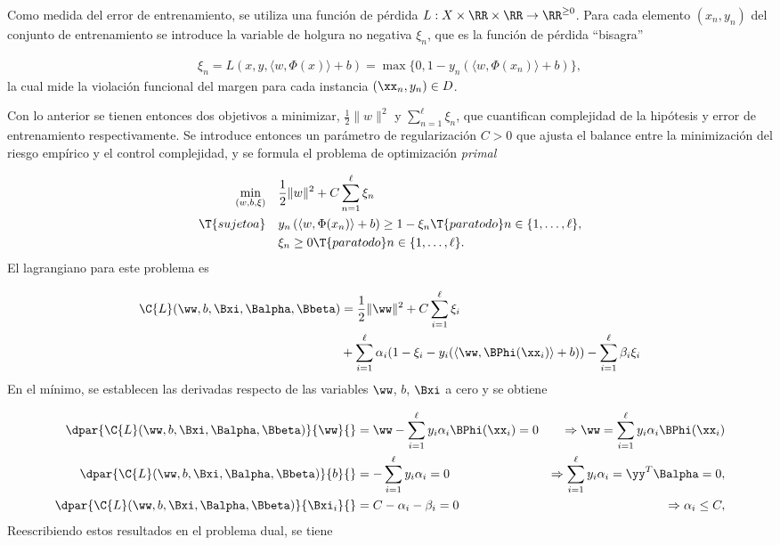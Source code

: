 Como medida del error de entrenamiento, se utiliza una función de
pérdida $L:X\times\RR\times\RR\rightarrow\RR^{\geq0}$.  Para cada
elemento $(x_n,y_n)$ del conjunto de entrenamiento se introduce la
variable de holgura no negativa $\xi_n$, que es la función de pérdida
``bisagra''

\begin{align}
\xi_n = 
  L(x,y,\langle{}w,\Phi(x)\rangle+b) =
  \max\{0,1-y_n(\langle{}w,\Phi(x_n)\rangle+b)\},
\end{align}
la cual mide la violación funcional del margen para cada instancia
$(\xx_n,y_n)\in{}D$.

Con lo anterior se tienen entonces dos objetivos a minimizar,
$\frac{1}2{}\|w\|^2$ y $\sum_{n=1}^{\ell}\xi_n$, que cuantifican
complejidad de la hipótesis y error de entrenamiento respectivamente.
Se introduce entonces un parámetro de regularización $C>0$ que
ajusta el balance entre la minimización del riesgo empírico y
el control complejidad, y se formula el problema
de optimización \emph{primal}

\begin{align}
\label{svm-primal-blando}
  \begin{split}
    \min_{(w,b,\xi)} \quad & \frac{1}{2}\|w\|^2+C\sum_{n=1}^{\ell}\xi_n\\
    \T{sujeto a} \quad &
    y_n\left(\langle{}w,\Phi(x_n)\rangle+b\right) \geq 1-\xi_n \T{ para todo }
    n\in\{1,\ldots,\ell\}, \\
    & \xi_n \geq 0 \T{ para todo } n\in\{1,\ldots,\ell\}.
  \end{split}
\end{align}
El lagrangiano para este problema es

\begin{align}
  \begin{split}    
  \C{L}(\ww,b,\Bxi,\Balpha,\Bbeta) &= \frac{1}{2} \|\ww\|^2 + C \sum_{i=1}^{\ell} \xi_i \\
  &+ \sum_{i=1}^{\ell} \alpha_i (1-\xi_i-y_i(\langle\ww,\BPhi(\xx_i)\rangle+b)) - \sum_{i=1}^{\ell} \beta_i\xi_i
  \end{split}
\end{align}
En el mínimo, se establecen las derivadas respecto de las variables
$\ww$, $b$, $\Bxi$ a cero y se obtiene

\begin{align}
  \dpar{ \C{L}(\ww,b,\Bxi,\Balpha,\Bbeta)}{\ww}{}
    &=\ww-\sum_{i=1}^\ell y_i\alpha_i\BPhi(\xx_i) = 0
    &\Rightarrow \ww = \sum_{i=1}^\ell y_i\alpha_i\BPhi(\xx_i)
  \label{dobleve}\\
  \dpar{ \C{L}(\ww,b,\Bxi,\Balpha,\Bbeta)}{b}{}
    &=-\sum_{i=1}^\ell y_i\alpha_i = 0
    &\Rightarrow \sum_{i=1}^\ell y_i\alpha_i = \yy^T\Balpha = 0,\\  
  \dpar{ \C{L}(\ww,b,\Bxi,\Balpha,\Bbeta)}{\Bxi_i}{}
    &=C-\alpha_i-\beta_i = 0
    &\Rightarrow \alpha_i \leq C,\\
\end{align}
Reescribiendo estos resultados en el problema dual, se tiene

